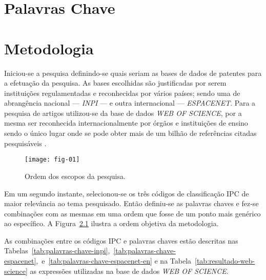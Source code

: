 \chapter{Palavras Chave}
\label{chap:palavras-chave}

\begin{PalavrasChave}
\end{PalavrasChave}



\chapter{Metodologia}
\label{chap:metodologia}

Iniciou-se a pesquisa definindo-se quais seriam as bases de dados de patentes para a efetuação da pesquisa. As bases escolhidas são justificadas por serem instituições regulamentadas e reconhecidas por vários países; sendo uma de abrangência nacional --- \emph{INPI} --- e outra internacional --- \emph{ESPACENET}. Para a pesquisa de artigos utilizou-se da base de dados \emph{WEB OF SCIENCE}, por a mesma ser reconhecida internacionalmente por órgãos e instituições de ensino sendo o único lugar onde se pode obter mais de um bilhão de referências citadas pesquisáveis \cite{web-of-science-2016}.

\begin{figure}[!htp]
  \centering
  \texttt{[image: fig-01]}
  \caption{Ordem dos escopos da pesquisa.}
  \label{fig:escopo-pesquisa}
\end{figure}

Em um segundo instante, selecionou-se os três códigos de classificação IPC de maior relevância ao tema pesquisado. Então definiu-se as palavras chaves e fez-se combinações com as mesmas em uma ordem que fosse de um ponto mais genérico ao específico. A Figura~\ref{fig:escopo-pesquisa} ilustra a ordem objetiva da metodologia.

As combinações entre os códigos IPC e palavras chaves estão descritas nas Tabelas~\ref{tab:palavras-chave-inpi},~\ref{tab:palavras-chave-espacenet},~e~\ref{tab:palavras-chave-espacenet-en} e na Tabela~\ref{tab:resultado-web-science} as expressões utilizadas na base de dados \emph{WEB OF SCIENCE}.


